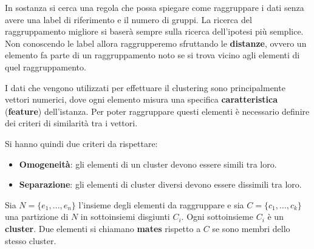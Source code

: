 In sostanza si cerca una regola che possa spiegare come raggruppare i dati senza
avere una label di riferimento e il numero di gruppi. La ricerca del raggruppamento
migliore si baserà sempre sulla ricerca dell'ipotesi più semplice. Non conoscendo
le label allora raggrupperemo sfruttando le \textbf{distanze}, ovvero un elemento
fa parte di un raggruppamento noto se si trova vicino agli elementi di quel
raggruppamento.

I dati che vengono utilizzati per effettuare il clustering sono principalmente
vettori numerici, dove ogni elemento misura una specifica \textbf{caratteristica}
(\textbf{feature}) dell'istanza. Per poter raggruppare questi elementi è necessario
definire dei criteri di similarità tra i vettori.

Si hanno quindi due criteri da rispettare:
\begin{itemize}
    \item \textbf{Omogeneità}: gli elementi di un cluster devono essere simili
          tra loro.
    \item \textbf{Separazione}: gli elementi di cluster diversi devono essere
          dissimili tra loro.
\end{itemize}
\begin{definizione}
    Sia $N = \{e_1, \dots, e_n\}$ l'insieme degli elementi da raggruppare e sia
    $C = \{c_1, \dots, c_k\}$ una partizione di $N$ in sottoinsiemi disgiunti
    $C_i$. Ogni sottoinsieme $C_i$ è un \textbf{cluster}. Due elementi si chiamano
    \textbf{mates} rispetto a $C$ se sono membri dello stesso cluster.
\end{definizione}
